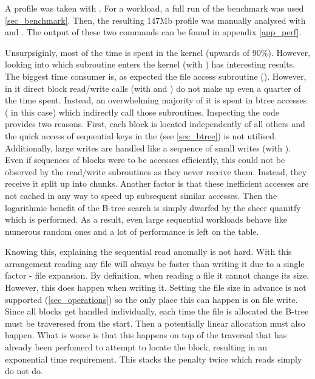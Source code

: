         A profile was taken with . For a
        workload, a full run of the benchmark was used \ref{sec_benchmark}.
        Then, the resulting 147Mb profile was manually analysed with
         and . The output of these two commands can be found in
        appendix \ref{app_perf}.

        Unsurpsiginly, most of the time is spent in the kernel (upwards of
        90\%). However, looking into which subroutine enters the kernel (with
        ) has interesting results. The biggest time
        consumer is, as expected the file access subroutine
        (). However, in it direct block
        read/write calls (with  and
        ) do not make up even a quarter of the time
        spent. Instead, an overwhelming majority of it is spent in btree
        accesses ( in this case) which indirectly
        call those subroutines. Inspecting the code provides two reasons.
        First, each block is located independently of all others and the quick
        access of sequential keys in the \bplustree (see \ref{sec_btree}) is
        not utilised. Additionally, large writes are handled like a sequence of
        small writes (with ). Even if
        sequences of blocks were to be accesses efficiently, this could not be
        observed by the read/write subroutines as they never receive them.
        Instead, they receive it split up into chunks. Another factor is that
        these inefficient accesses are not cached in any way to speed up
        subsequent similar accesses. Then the logarithmic benefit of the B-tree
        search is simply dwarfed by the sheer quanitfy which is performed. As a
        result, even large sequential workloads behave like numerous random
        ones and a lot of performance is left on the table.

        Knowing this, explaining the sequential read anomally is not hard. With
        this arrangement reading any file will always be faster than writing it
        due to a single factor - file expansion. By definition, when reading a
        file it cannot change its size. However, this does happen when writing
        it. Setting the file size in advance is not supported
        (\ref{sec_operations}) so the only place this can happen is on file
        write. Since all blocks get handled individually, each time the file is
        allocated the B-tree must be traveresed from the start. Then a
        potentially linear allocation must also happen. What is worse is that
        this happens on top of the traversal that has already been perfomerd to
        attempt to locate the block, resulting in an exponential time
        requirement. This stacks the penalty twice which reads simply do not
        do.

